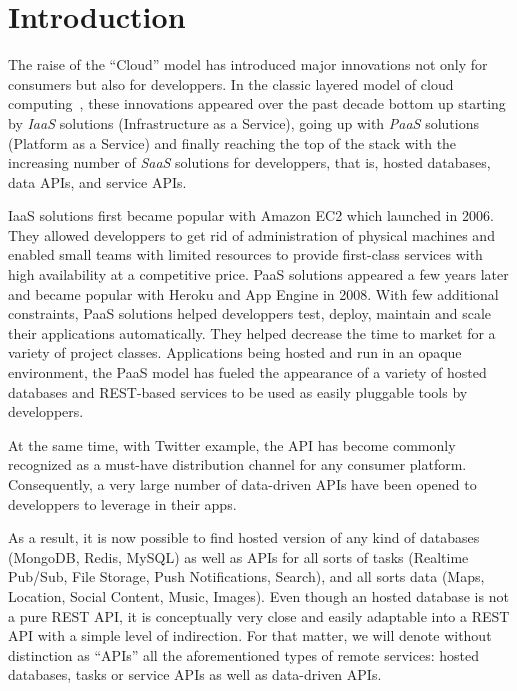 
\section{Introduction}

The raise of the ``Cloud'' model has introduced major innovations not
only for consumers but also for developpers. In the classic layered
model of cloud computing~\cite{nist:cloud}, these innovations appeared
over the past decade bottom up starting by \emph{IaaS} solutions
(Infrastructure as a Service), going up with \emph{PaaS}
solutions (Platform as a Service) and finally reaching the top of the
stack with the increasing number of \emph{SaaS} solutions for
developpers, that is, hosted databases, data APIs, and service APIs.

IaaS solutions first became popular with Amazon EC2 which launched in
2006. They allowed developpers to get rid of administration of physical
machines and enabled small teams with limited resources to provide
first-class services with high availability at a competitive
price. PaaS solutions appeared a few years later and became popular with
Heroku and App Engine in 2008. With few additional constraints, PaaS
solutions helped developpers test, deploy, maintain and scale their
applications automatically. They helped decrease the time to market
for a variety of project classes. Applications being hosted and run in
an opaque environment, the PaaS model has fueled the appearance of a
variety of hosted databases and REST-based services to be
used as easily pluggable tools by developpers.

At the same time, with Twitter example, the API has become commonly
recognized as a must-have distribution channel for any consumer
platform. Consequently, a very large number of data-driven APIs have
been opened to developpers to leverage in their apps.

As a result, it is now possible to find hosted version of any kind of
databases (MongoDB, Redis, MySQL) as well as APIs for all sorts of
tasks (Realtime Pub/Sub, File Storage, Push Notifications, Search),
and all sorts data (Maps, Location, Social Content, Music, Images).
Even though an hosted database is not a pure REST API, it is
conceptually very close and easily adaptable into a REST API with a
simple level of indirection. For that matter, we will denote without
distinction as ``APIs'' all the aforementioned types of remote
services: hosted databases, tasks or service APIs as well as
data-driven APIs.

